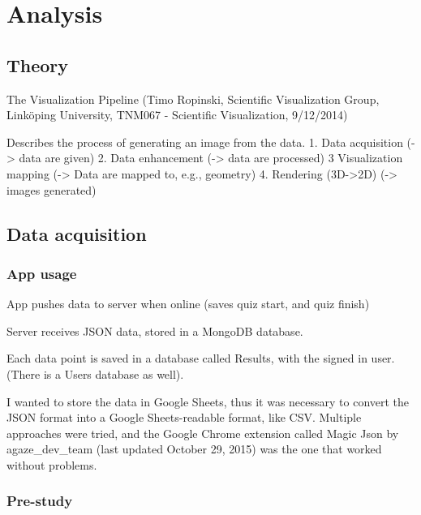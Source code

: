 \chapter{Analysis}


\section{Theory}

The Visualization Pipeline (Timo Ropinski, Scientific Visualization Group, Linköping University, TNM067 - Scientific Visualization, 9/12/2014)

Describes the process of generating an image from the data.
1. Data acquisition (-> data are given)
2. Data enhancement (-> data are processed)
3 Visualization mapping (-> Data are mapped to, e.g., geometry)
4. Rendering (3D->2D) (-> images generated)

\section{Data acquisition}

\subsection{App usage}
App pushes data to server when online (saves quiz start, and quiz finish)

Server receives JSON data, stored in a MongoDB database.

Each data point is saved in a database called Results, with the signed in user. (There is a Users database as well).

I wanted to store the data in Google Sheets, thus it was necessary to convert the JSON format into a Google Sheets-readable format, like CSV. Multiple approaches were tried, and the Google Chrome extension called Magic Json by agaze\_dev\_team (last updated October 29, 2015) %
was the one that worked without problems.

\subsection{Pre-study}

